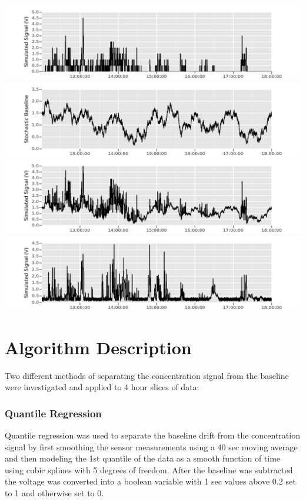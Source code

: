 \documentclass[a0, landscape]{a0poster}
\begin{document}
\begin{multicols}{3}
\begin{center}			
	\includegraphics[width=\linewidth]{BaseSim}
	\includegraphics[width=\linewidth]{BaseRand}
	\includegraphics[width=\linewidth]{BaseTotal}
	\includegraphics[width=\linewidth]{RemoteTotal}
\end{center}



\section*{Algorithm Description}
Two different methods of separating the concentration signal from the baseline were investigated and applied to 4 hour slices of data: 
\subsubsection*{Quantile Regression} 
Quantile regression was used to separate the baseline drift from the concentration signal by first smoothing the sensor measurements using a 40 sec moving average and then modeling the 1st quantile of the data as a smooth function of time using cubic splines with 5 degrees of freedom. After the baseline was subtracted the voltage was converted into a boolean variable with 1 sec values above 0.2 set to 1 and otherwise set to 0. 
\columnbreak


\end{multicols}
\end{document}
